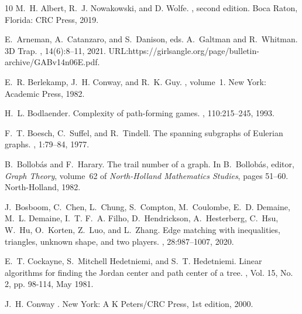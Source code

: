 \documentclass{article}
\theoremstyle{plain}
\theoremstyle{definition}
\begin{document}
\begin{thebibliography}{10}
M.~H. Albert, R.~J. Nowakowski, and D. Wolfe.
, second edition.
\newblock Boca Raton, Florida: CRC Press, 2019.

E.~Arneman, A.~Catanzaro, and S.~Danison, eds. A.~Galtman and R.~Whitman.
\newblock 3D Trap. 
, 
14(6):8--11, 2021.
\newblock URL:https://girlsangle.org/page/bulletin-archive/GABv14n06E.pdf.

E.~R. Berlekamp, J.~H. Conway, and R.~K. Guy.
, volume~1.
\newblock New York: Academic Press, 1982.

H.~L. Bodlaender.
\newblock Complexity of path-forming games.
, 110:215--245, 1993.

F.~T. Boesch, C.~Suffel, and R.~Tindell.
\newblock The spanning subgraphs of {E}ulerian graphs.
, 1:79--84, 1977.

B.~Bollobás and F.~Harary.
\newblock The trail number of a graph.
\newblock In B.~Bollobás, editor, {\em Graph Theory}, volume~62 of {\em North-Holland Mathematics Studies}, pages 51--60. North-Holland, 1982.

J.~Bosboom, C.~Chen, L.~Chung, S.~Compton, M.~Coulombe, E.~D. Demaine, M.~L. Demaine, I.~T. F.~A. Filho, D.~Hendrickson, A.~Hesterberg, C.~Hsu, W.~Hu, O.~Korten, Z.~Luo, and L.~Zhang.
\newblock Edge matching with inequalities, triangles, unknown shape, and two players.
, 28:987--1007, 2020.

E.~T. Cockayne, S.~Mitchell Hedetniemi, and S.~T. Hedetniemi.
\newblock Linear algorithms for finding the Jordan center and path center of a tree.
, Vol. 15, No. 2, pp. 98-114, May 1981.

J.~H. Conway
. 
\newblock New York: A K Peters/CRC Press, 1st edition, 2000.




\end{thebibliography}
\end{document}
